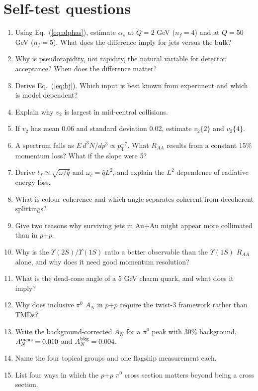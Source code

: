 \documentclass[11pt,letterpaper]{article}
\newcommand{\pT}{p_{\mathrm{T}}}
\newcommand{\RAA}{R_{AA}}
\begin{document}
\section{Self-test questions}\label{sec:selftest}
\begin{enumerate}[label=Q\arabic*.]
\item Using Eq.~(\ref{eq:alphas}), estimate $\alpha_s$ at $Q=2$ GeV ($n_f=4$) and at $Q=50$ GeV ($n_f=5$). What does the
difference imply for jets versus the bulk?
\item Why is pseudorapidity, not rapidity, the natural variable for detector acceptance? When does the difference matter?
\item Derive Eq.~(\ref{eq:bj}). Which input is best known from experiment and which is model dependent?
\item Explain why $v_2$ is largest in mid-central collisions.
\item If $v_2$ has mean 0.06 and standard deviation 0.02, estimate $v_2\{2\}$ and $v_2\{4\}$.
\item A spectrum falls as $E\,d^3N/dp^3\propto\pT^{-7}$. What $\RAA$ results from a constant 15\% momentum loss? What if the slope were 5?
\item Derive $t_f\simeq\sqrt{\omega/\hat q}$ and $\omega_c=\hat qL^2$, and explain the $L^2$ dependence of radiative energy loss.
\item What is colour coherence and which angle separates coherent from decoherent splittings?
\item Give two reasons why surviving jets in Au+Au might appear more collimated than in $p$+$p$.
\item Why is the $\Upsilon(2S)/\Upsilon(1S)$ ratio a better observable than the $\Upsilon(1S)$ $\RAA$ alone, and why does it need
good momentum resolution?
\item What is the dead-cone angle of a 5 GeV charm quark, and what does it imply?
\item Why does inclusive $\pi^0$ $A_N$ in $p$+$p$ require the twist-3 framework rather than TMDs?
\item Write the background-corrected $A_N$ for a $\pi^0$ peak with 30\% background, $A_N^{\rm meas}=0.010$ and $A_N^{\rm bkg}=0.004$.
\item Name the four topical groups and one flagship measurement each.
\item List four ways in which the $p$+$p$ $\pi^0$ cross section matters beyond being a cross section.
\end{enumerate}
\end{document}
